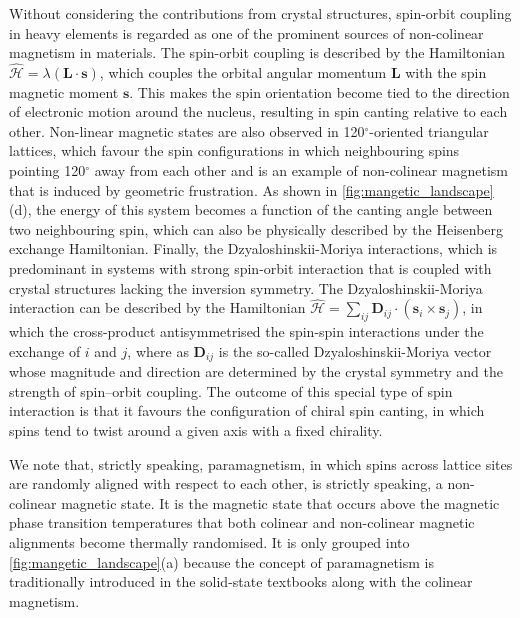 Without considering the contributions from crystal structures, spin-orbit coupling in heavy elements is regarded as one of the prominent sources of non-colinear magnetism in materials. The spin-orbit coupling is described by the Hamiltonian $\hat{\mathcal{H}}=\lambda(\bm{L}\cdot\bm{s})$, which couples the orbital angular momentum $\bm{L}$ with the spin magnetic moment $\bm{s}$. This makes the spin orientation become tied to the direction of electronic motion around the nucleus, resulting in spin canting relative to each other. Non-linear magnetic states are also observed in 120$^\circ$-oriented triangular lattices,\cite{sakuma2002magnetic,wang2008spin,yin2022topological} which favour the spin configurations in which neighbouring spins pointing 120$^\circ$ away from each other and is an example of non-colinear magnetism that is induced by geometric frustration. As shown in \cref{fig:mangetic_landscape}(d), the energy of this system becomes a function of the canting angle between two neighbouring spin,\cite{baumsteiger2025exploring} which can also be physically described by the Heisenberg exchange Hamiltonian. Finally, the Dzyaloshinskii-Moriya\cite{dzyaloshinsky1958thermodynamic,moriya1960anisotropic} interactions, which is predominant in systems with strong spin-orbit interaction that is coupled with crystal structures lacking the inversion symmetry. The Dzyaloshinskii-Moriya interaction can be described by the Hamiltonian $\hat{\mathcal{H}}=\sum_{ij}\bm{D}_{ij}\cdot(\bm{s}_i\times\bm{s}_j)$, in which the cross-product antisymmetrised the spin-spin interactions under the exchange of $i$ and $j$, where as $\bm{D}_{ij}$ is the so-called Dzyaloshinskii-Moriya vector whose magnitude and direction are determined by the crystal symmetry and the strength of spin–orbit coupling. The outcome of this special type of spin interaction is that it favours the configuration of chiral spin canting, in which spins tend to twist around a given axis with a fixed chirality.   
 
We note that, strictly speaking, paramagnetism, in which spins across lattice sites are randomly aligned with respect to each other, is strictly speaking, a non-colinear magnetic state. It is the magnetic state that occurs above the magnetic phase transition temperatures that both colinear and non-colinear magnetic alignments become thermally randomised. It is only grouped into \cref{fig:mangetic_landscape}(a) because the concept of paramagnetism is traditionally introduced in the solid-state textbooks along with the colinear magnetism.

